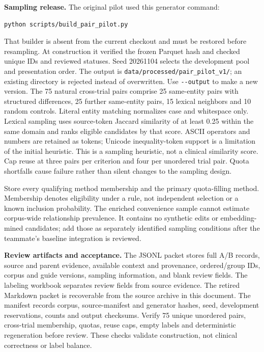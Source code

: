 \documentclass[10pt,letterpaper]{article}
\newcommand{\pathcode}[1]{\nolinkurl{#1}}
\begin{document}
\textbf{Sampling release.} The original pilot used this generator command:
\begin{verbatim}
python scripts/build_pair_pilot.py
\end{verbatim}
That builder is absent from the current checkout and must be restored before
resampling. At construction it verified the frozen Parquet hash and checked unique
IDs and reviewed statuses. Seed 20261104 selects the development pool and
presentation order. The output is
\pathcode{data/processed/pair_pilot_v1/}; an existing directory is rejected
instead of overwritten. Use \pathcode{--output} to make a new version.
The 75 natural cross-trial pairs comprise 25 same-entity pairs with structured
differences, 25 further same-entity pairs, 15 lexical neighbors and 10 random
controls. Literal entity matching normalizes case and whitespace only.
Lexical sampling uses source-token Jaccard similarity of at least 0.25
within the same domain and ranks eligible candidates by that score.
ASCII operators and numbers are retained as tokens; Unicode inequality-token
support is a limitation of the initial heuristic. This is a sampling heuristic,
not a clinical similarity score. Cap reuse at three pairs per criterion and
four per unordered trial pair. Quota shortfalls cause failure rather than
silent changes to the sampling design.

Store every qualifying method membership and the primary quota-filling
method. Membership denotes eligibility under a rule, not independent
selection or a known inclusion probability. The enriched convenience sample
cannot estimate corpus-wide relationship prevalence. It contains no synthetic
edits or embedding-mined candidates; add those as separately identified
sampling conditions after the teammate's baseline integration is reviewed.

\textbf{Review artifacts and acceptance.} The JSONL packet stores full A/B
records, source and parent evidence, available context and provenance,
ordered/group IDs, corpus and guide versions, sampling information, and blank
review fields. The labeling workbook separates review fields from source evidence. The
retired Markdown packet is recoverable from the source archive in this document. The manifest records corpus, source-manifest and generator hashes,
seed, development reservations, counts and output checksums. Verify 75 unique
unordered pairs, cross-trial membership, quotas, reuse caps, empty labels and
deterministic regeneration before review. These checks validate construction,
not clinical correctness or label balance.
\end{document}
